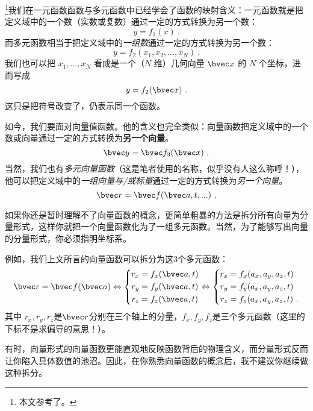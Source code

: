 
\begin{issues}
\end{issues}


\footnote{本文参考了\cite{Thomas}。}我们在一元函数函数与多元函数中已经学会了函数的映射含义：一元函数就是把定义域中的一个数（实数或复数）通过一定的方式转换为另一个数：
\begin{equation}
y=f_1(x)~.
\end{equation}
而多元函数相当于把定义域中的\textsl{一组数}通过一定的方式转换为另一个数：
\begin{equation}
y=f_2(x_1, x_2,...,x_N)~.
\end{equation}
我们也可以把 $x_1,\dots,x_N$ 看成是一个（$N$ 维）几何向量 $\bvec x$ 的 $N$ 个坐标，进而写成
\begin{equation}
y=f_2(\bvec x)~.
\end{equation}
这只是把符号改变了，仍表示同一个函数。

如今，我们要面对向量值函数。他的含义也完全类似：向量函数把定义域中的一个数或向量通过一定的方式转换为\textbf{另一个向量}。
$$
\bvec y = \bvec f_3 (\bvec x)~.
$$
当然，我们也有\textsl{多元向量函数}（这是笔者使用的名称，似乎没有人这么称呼！），他可以把定义域中的\textsl{一组向量与/或标量}通过一定的方式转换为\textsl{另一个向量}。
$$
\bvec r = \bvec f (\bvec a, t, ...)~.
$$

如果你还是暂时理解不了向量函数的概念，更简单粗暴的方法是拆分所有向量为分量形式，这样你就把一个向量函数化为了一组多元函数。当然，为了能够写出向量的分量形式，你必须指明坐标系。

例如，我们上文所言的向量函数可以拆分为这$3$个多元函数：
$$
\bvec r = \bvec f (\bvec a)
\Leftrightarrow
\left \{
\begin{aligned}
r_x &= f_x(\bvec a, t)\\
r_y &= f_y(\bvec a, t)\\
r_z &= f_z(\bvec a, t)\\
\end{aligned}
\right.
\Leftrightarrow
\left \{
\begin{aligned}
r_x &= f_x(a_x,a_y,a_z,t)\\
r_y &= f_y(a_x,a_y,a_z,t)\\
r_z &= f_z(a_x,a_y,a_z,t)~.\\
\end{aligned}
\right.
$$
其中 $r_x, r_y, r_z$是$\bvec r$分别在三个轴上的分量，$f_x,f_y,f_z$是三个多元函数（这里的下标不是求偏导的意思！）。

有时，向量形式的向量函数更能直观地反映函数背后的物理含义，而分量形式反而让你陷入具体数值的池沼。因此，在你熟悉向量函数的概念后，我不建议你继续做这种拆分。
